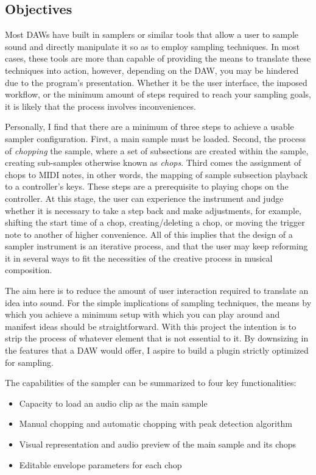\documentclass[12pt, a4paper, hidelinks]{article}
\begin{document}
	\subsection{Objectives}
	Most DAWs have built in samplers or similar tools that allow a user to sample sound and directly manipulate it so as to employ sampling techniques. In most cases, these tools are more than capable of providing the means to translate these techniques into action, however, depending on the DAW, you may be hindered due to the program's presentation. Whether it be the user interface, the imposed workflow, or the minimum amount of steps required to reach your sampling goals, it is likely that the process involves inconveniences.\par 
	Personally, I find that there are a minimum of three steps to achieve a usable sampler configuration. First, a main sample must be loaded. Second, the process of \textit{chopping} the sample, where a set of subsections are created within the sample, creating sub-samples otherwise known as \textit{chops}. Third comes the assignment of chops to MIDI notes, in other words, the mapping of sample subsection playback to a controller's keys. These steps are a prerequisite to playing chops on the controller. At this stage, the user can experience the instrument and judge whether it is necessary to take a step back and make adjustments, for example, shifting the start time of a chop, creating/deleting a chop, or moving the trigger note to another of higher convenience. All of this implies that the design of a sampler instrument is an iterative process, and that the user may keep reforming it in several ways to fit the necessities of the creative process in musical composition.
	\par	
	The aim here is to reduce the amount of user interaction required to translate an idea into sound. For the simple implications of sampling techniques, the means by which you achieve a minimum setup with which you can play around and manifest ideas should be straightforward. With this project the intention is to strip the process of whatever element that is not essential to it. By downsizing in the features that a DAW would offer, I aspire to build a plugin strictly optimized for sampling. %
	\par
	The capabilities of the sampler can be summarized to four key functionalities:
	\begin{itemize}
		\item Capacity to load an audio clip as the main sample 					%
		\item Manual chopping and automatic chopping with peak detection algorithm 	%
		\item Visual representation and audio preview of the main sample and its chops
		\item Editable envelope parameters for each chop							%
	\end{itemize}
	
\end{document}
